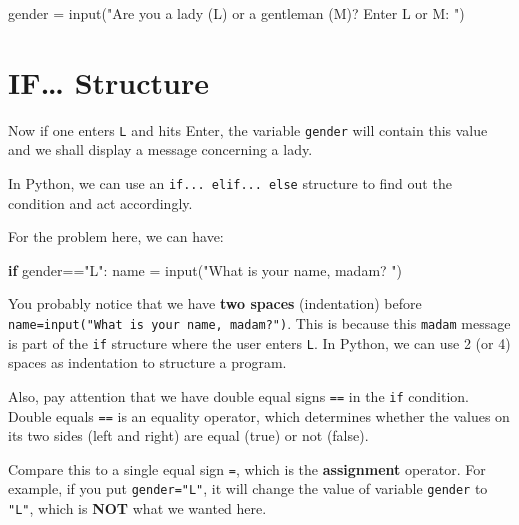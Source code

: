 \documentclass[
  letterpaper,
]{scrbook}
\newenvironment{Shaded}{\begin{snugshade}}{\end{snugshade}}
\newcommand{\BuiltInTok}[1]{\textcolor[rgb]{0.00,0.23,0.31}{#1}}
\newcommand{\ControlFlowTok}[1]{\textcolor[rgb]{0.00,0.23,0.31}{\textbf{#1}}}
\newcommand{\NormalTok}[1]{\textcolor[rgb]{0.00,0.23,0.31}{#1}}
\newcommand{\OperatorTok}[1]{\textcolor[rgb]{0.37,0.37,0.37}{#1}}
\newcommand{\StringTok}[1]{\textcolor[rgb]{0.13,0.47,0.30}{#1}}
\begin{document}
\begin{Shaded}
\begin{Highlighting}[]
\NormalTok{gender }\OperatorTok{=} \BuiltInTok{input}\NormalTok{(}\StringTok{"Are you a lady (L) or a gentleman (M)? Enter L or M: "}\NormalTok{)}
\end{Highlighting}
\end{Shaded}

\section*{IF\ldots{} Structure}\label{if-structure}


Now if one enters \texttt{L} and hits Enter, the variable
\texttt{gender} will contain this value and we shall display a message
concerning a lady.

In Python, we can use an \texttt{if...\ elif...\ else} structure to find
out the condition and act accordingly.

For the problem here, we can have:

\begin{Shaded}
\begin{Highlighting}[]
\ControlFlowTok{if}\NormalTok{ gender}\OperatorTok{==}\StringTok{"L"}\NormalTok{:}
\NormalTok{  name }\OperatorTok{=} \BuiltInTok{input}\NormalTok{(}\StringTok{"What is your name, madam? "}\NormalTok{)}
\end{Highlighting}
\end{Shaded}

You probably notice that we have \textbf{two spaces} (indentation)
before \texttt{name=input("What\ is\ your\ name,\ madam?")}. This is
because this \texttt{madam} message is part of the \texttt{if} structure
where the user enters \texttt{L}. In Python, we can use 2 (or 4) spaces
as indentation to structure a program.

Also, pay attention that we have double equal signs \texttt{==} in the
\texttt{if} condition. Double equals \texttt{==} is an equality
operator, which determines whether the values on its two sides (left and
right) are equal (true) or not (false).

Compare this to a single equal sign \texttt{=}, which is the
\textbf{assignment} operator. For example, if you put
\texttt{gender="L"}, it will change the value of variable
\texttt{gender} to \texttt{"L"}, which is \textbf{NOT} what we wanted
here.
\end{document}
